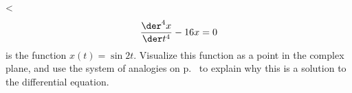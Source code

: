 <%
\begin{equation*}
  \frac{\der^4 x}{\der t^4} - 16 x = 0
\end{equation*}
is the function $x(t)=\sin 2t$. Visualize this function as
a point in the complex plane, and use the system of analogies
on p.~\pageref{table-of-complex-plane-analogies} to explain
why this is a solution to the differential equation.

